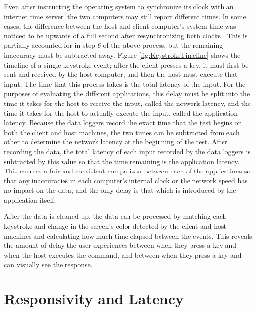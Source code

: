 Even after instructing the operating system to synchronize its clock with an internet time server, the two computers may still report different times.
In some cases, the difference between the host and client computer's system time was noticed to be upwards of a full second after resynchronizing both clocks \cite{time.is}.
This is partially accounted for in step \emph{6} of the above process, but the remaining inaccuracy must be subtracted away.
Figure \ref{fig:KeystrokeTimeline} shows the timeline of a single keystroke event; after the client presses a key, it must first be sent and received by the host computer, and then the host must execute that input.
The time that this process takes is the total latency of the input.
For the purposes of evaluating the different applications, this delay must be split into the time it takes for the host to receive the input, called the network latency, and the time it takes for the host to actually execute the input, called the application latency.
Because the data loggers record the exact time that the test begins on both the client and host machines, the two times can be subtracted from each other to determine the network latency at the beginning of the test.
After recording the data, the total latency of each input recorded by the data loggers is subtracted by this value so that the time remaining is the application latency.
This ensures a fair and consistent comparison between each of the applications so that any inaccuracies in each computer's internal clock or the network speed has no impact on the data, and the only delay is that which is introduced by the application itself.

After the data is cleaned up, the data can be processed by matching each keystroke and change in the screen's color detected by the client and host machines and calculating how much time elapsed between the events.
This reveals the amount of delay the user experiences between when they press a key and when the host executes the command, and between when they press a key and can visually see the response.


\section{Responsivity and Latency}\label{sec:ResponsivityAndLatency}

